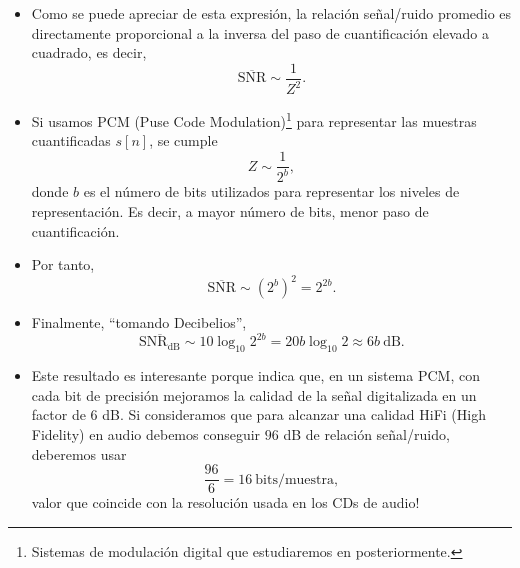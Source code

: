 \begin{itemize}
  \item Como se puede apreciar de esta expresi\'on, la relaci\'on
  se\~nal/ruido promedio es directamente proporcional a la inversa del
  paso de cuantificaci\'on elevado a cuadrado, es decir,
\begin{equation*}
  \overline{\text{SNR}}\sim \frac{1}{Z^2}.
\end{equation*}
\item Si usamos PCM (Puse Code Modulation)\footnote{Sistemas de
  modulaci\'on digital que estudiaremos en posteriormente.} para
  representar las muestras cuantificadas $s[n]$, se cumple
\begin{equation*}
  Z\sim\frac{1}{2^b},
\end{equation*}
donde $b$ es el n\'umero de bits utilizados para representar los niveles
de representaci\'on. Es decir, a mayor n\'umero de bits, menor paso de
cuantificaci\'on.
\item Por tanto,
  \begin{equation*}
    \overline{\text{SNR}}\sim (2^b)^2 = 2^{2b}.
  \end{equation*}
\item Finalmente, ``tomando Decibelios'',
   \begin{equation*}
    \overline{\text{SNR}_{\text{dB}}}\sim 10\log_{10} 2^{2b} = 20b\log_{10} 2
    \approx 6b~\text{dB}.
  \end{equation*}

\item Este resultado es interesante porque indica que, en un sistema
  PCM, con cada bit de precisi\'on mejoramos la calidad de la se\~nal
  digitalizada en un factor de $6$ dB. Si consideramos que para
  alcanzar una calidad HiFi (High Fidelity) en audio debemos conseguir
  $96$ dB de relaci\'on se\~nal/ruido, deberemos usar
  \begin{displaymath}
    \frac{96}{6} = 16~\text{bits/muestra},
  \end{displaymath}
  valor que coincide con la resoluci\'on usada en los CDs de audio!
  
\end{itemize}

